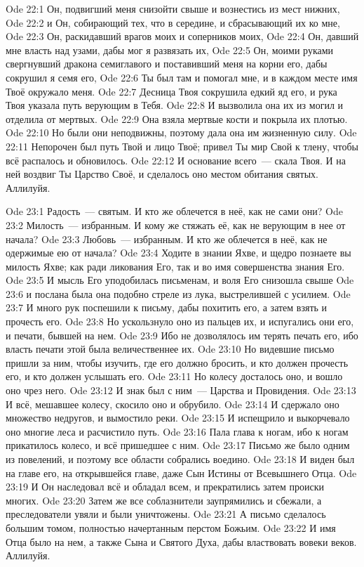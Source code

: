 \vs Ode 22:1
Он, подвигший
меня снизойти свыше и вознестись из мест нижних,
\vs Ode 22:2
и Он,
собирающий тех, что в середине, и сбрасывающий их ко мне,
\vs Ode 22:3
Он,
раскидавший врагов моих и соперников моих,
\vs Ode 22:4
Он, давший мне
власть над узами, дабы мог я развязать их,
\vs Ode 22:5
Он, моими
руками свергнувший дракона семиглавого и поставивший меня на корни его, дабы
сокрушил я семя его,
\vs Ode 22:6
Ты был там и
помогал мне, и в каждом месте имя Твоё окружало меня.
\vs Ode 22:7
Десница Твоя
сокрушила едкий яд его, и рука Твоя указала путь верующим в Тебя.
\vs Ode 22:8
И вызволила
она их из могил и отделила от мертвых.
\vs Ode 22:9
Она взяла
мертвые кости и покрыла их плотью.
\vs Ode 22:10
Но были они
неподвижны, поэтому дала она им жизненную силу.
\vs Ode 22:11
Непорочен был
путь Твой и лицо Твоё; привел Ты мир Свой к тлену, чтобы всё распалось и
обновилось.
\vs Ode 22:12
И основание
всего~--- скала Твоя. И на ней воздвиг Ты Царство Своё, и сделалось оно местом
обитания святых.
Аллилуйя.

\vs Ode 23:1
Радость~---
святым. И кто же облечется в неё, как не сами они?
\vs Ode 23:2
Милость~---
избранным. И кому же стяжать её, как не верующим в нее от начала?
\vs Ode 23:3
Любовь~---
избранным. И кто же облечется в неё, как не одержимые ею от начала?
\vs Ode 23:4
Ходите в
знании Яхве, и щедро познаете вы милость Яхве; как ради ликования Его, так и во
имя совершенства знания Его.
\vs Ode 23:5
И мысль Его
уподобилась письменам, и воля Его снизошла свыше
\vs Ode 23:6
и послана была
она подобно стреле из лука, выстрелившей с усилием.
\vs Ode 23:7
И много рук
поспешили к письму, дабы похитить его, а затем взять и прочесть его.
\vs Ode 23:8
Но ускользнуло
оно из пальцев их, и испугались они его, и печати, бывшей на нем.
\vs Ode 23:9
Ибо не
дозволялось им терять печать его, ибо власть печати этой была величественнее их.
\vs Ode 23:10
Но видевшие
письмо пришли за ним, чтобы изучить, где его должно бросить, и кто должен
прочесть его, и кто должен услышать его.
\vs Ode 23:11
Но колесу
досталось оно, и вошло оно чрез него.
\vs Ode 23:12
И знак был с
ним~--- Царства и Провидения.
\vs Ode 23:13
И всё,
мешавшее колесу, скосило оно и обрубило.
\vs Ode 23:14
И сдержало
оно множество недругов, и вымостило реки.
\vs Ode 23:15
И испещрило и
выкорчевало оно многие леса и расчистило путь.
\vs Ode 23:16
Пала глава к
ногам, ибо к ногам прикатилось колесо, и всё пришедшее с ним.
\vs Ode 23:17
Письмо же
было одним из повелений, и поэтому все области собрались воедино.
\vs Ode 23:18
И виден был
на главе его, на открывшейся главе, даже Сын Истины от Всевышнего Отца.
\vs Ode 23:19
И Он
наследовал всё и обладал всем, и прекратились затем происки многих.
\vs Ode 23:20
Затем же все
соблазнители заупрямились и сбежали, а преследователи увяли и были уничтожены.
\vs Ode 23:21
А письмо
сделалось большим томом, полностью начертанным перстом Божьим.
\vs Ode 23:22
И имя Отца
было на нем, а также Сына и Святого Духа, дабы властвовать вовеки веков.
Аллилуйя.

